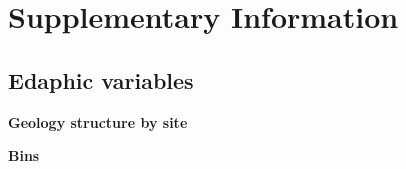 \documentclass{thesis}
\begin{document}
\pagestyle{header-footer}








\clearpage

\pagestyle{header-footer}






\clearpage


% 







\appendix

\vspace{-1em}

\section{Supplementary Information}\label{app:dataset}

\subsection{Edaphic variables}
\textbf{Geology structure by site}

\begin{figure}[h!]
	\centering
\end{figure}

\textbf{Bins}

\begin{figure}[h!]
	\centering
\end{figure}
\end{document}
